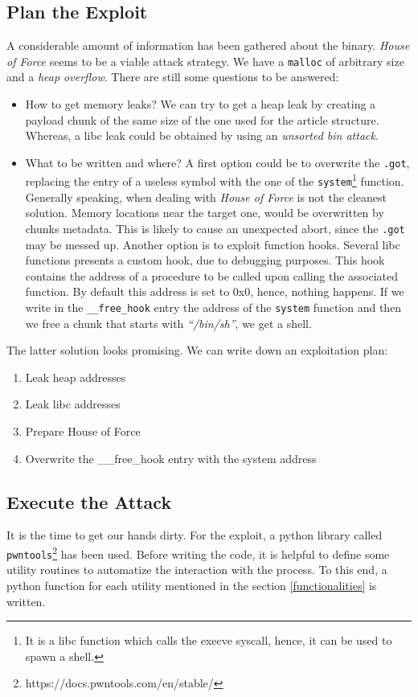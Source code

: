\documentclass{article}
\numberwithin{equation}{subsection}
\begin{document}
\subsection{Plan the Exploit}
A considerable amount of information has been gathered about the binary. \emph{House of Force} seems to be a viable attack strategy. We have a \texttt{malloc} of arbitrary size and a \emph{heap overflow}. There are still some questions to be answered:
\begin{itemize}
    \item How to get memory leaks? We can try to get a heap leak by creating a payload chunk of the same size of the one used for the article structure. Whereas, a libc leak could be obtained by using an \emph{unsorted bin attack}.
    \item What to be written and where? A first option could be to overwrite the \texttt{.got}, replacing the entry of a useless symbol with the one of the \texttt{system}\footnote{It is a libc function which calls the execve syscall, hence, it can be used to spawn a shell.} function. Generally speaking, when dealing with \emph{House of Force} is not the cleanest solution. Memory locations near the target one, would be overwritten by chunks metadata. This is likely to cause an unexpected abort, since the \texttt{.got} may be messed up. Another option is to exploit function hooks. Several libc functions presents a custom hook, due to debugging purposes. This hook contains the address of a procedure to be called upon calling the associated function. By default this address is set to 0x0, hence, nothing happens. If we write in the \texttt{\_\_free\_hook} entry the address of the \texttt{system} function and then we free a chunk that starts with \textit{``/bin/sh''}, we get a shell. 
\end{itemize}
The latter solution looks promising. We can write down an exploitation plan:
\begin{enumerate}
    \item Leak heap addresses
    \item Leak libc addresses
    \item Prepare House of Force
    \item Overwrite the \_\_free\_hook entry with the system address
\end{enumerate}
\subsection{Execute the Attack}
It is the time to get our hands dirty. For the exploit, a python library called \texttt{pwntools}\footnote{https://docs.pwntools.com/en/stable/} has been used. Before writing the code, it is helpful to define some utility routines to automatize the interaction with the process. To this end, a python function for each utility mentioned in the section \ref{functionalities} is written.
\end{document}
